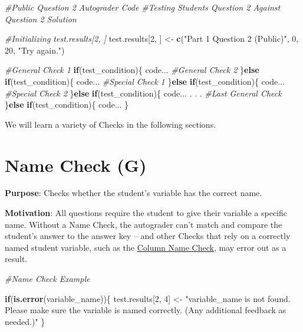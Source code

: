 \documentclass[
  12pt,
]{book}
\newenvironment{Shaded}{\begin{snugshade}}{\end{snugshade}}
\newcommand{\CommentTok}[1]{\textcolor[rgb]{0.56,0.35,0.01}{\textit{#1}}}
\newcommand{\ControlFlowTok}[1]{\textcolor[rgb]{0.13,0.29,0.53}{\textbf{#1}}}
\newcommand{\DecValTok}[1]{\textcolor[rgb]{0.00,0.00,0.81}{#1}}
\newcommand{\FunctionTok}[1]{\textcolor[rgb]{0.13,0.29,0.53}{\textbf{#1}}}
\newcommand{\NormalTok}[1]{#1}
\newcommand{\OtherTok}[1]{\textcolor[rgb]{0.56,0.35,0.01}{#1}}
\newcommand{\StringTok}[1]{\textcolor[rgb]{0.31,0.60,0.02}{#1}}
\begin{document}
\begin{Shaded}
\begin{Highlighting}[]
\CommentTok{\#Public Question 2 Autograder Code}
\CommentTok{\#Testing Student\textquotesingle{}s Question 2 Against Question 2 Solution}

\CommentTok{\#Initializing test.results[2, ]}
\NormalTok{test.results[}\DecValTok{2}\NormalTok{, ] }\OtherTok{\textless{}{-}} \FunctionTok{c}\NormalTok{(}\StringTok{"Part 1 Question 2 (Public)"}\NormalTok{, }\DecValTok{0}\NormalTok{, }\DecValTok{20}\NormalTok{, }\StringTok{"Try again."}\NormalTok{)}

\CommentTok{\#General Check 1}
\ControlFlowTok{if}\NormalTok{(test\_condition)\{ }
\NormalTok{  code... }
\CommentTok{\#General Check 2}
\NormalTok{\}}\ControlFlowTok{else} \ControlFlowTok{if}\NormalTok{(test\_condition)\{ }
\NormalTok{  code...}
\CommentTok{\#Special Check 1}
\NormalTok{\}}\ControlFlowTok{else} \ControlFlowTok{if}\NormalTok{(test\_condition)\{ }
\NormalTok{  code...}
\CommentTok{\#Special Check 2}
\NormalTok{\}}\ControlFlowTok{else} \ControlFlowTok{if}\NormalTok{(test\_condition)\{ }
\NormalTok{  code...}
\NormalTok{.}
\NormalTok{.}
\NormalTok{.}
\CommentTok{\#Last General Check }
\NormalTok{\}}\ControlFlowTok{else} \ControlFlowTok{if}\NormalTok{(test\_condition)\{}
\NormalTok{  code... }
\NormalTok{\}}
\end{Highlighting}
\end{Shaded}

We will learn a variety of Checks in the following sections.

\section{Name Check (G)}\label{Name-Check}

\textbf{Purpose}: Checks whether the student's variable has the correct name.

\textbf{Motivation}: All questions require the student to give their variable a specific name. Without a Name Check, the autograder can't match and compare the student's answer to the answer key -- and other Checks that rely on a correctly named student variable, such as the \hyperref[Column-Name-Check]{Column Name Check}, may error out as a result.

\begin{Shaded}
\begin{Highlighting}[]
\CommentTok{\#Name Check Example}

\ControlFlowTok{if}\NormalTok{(}\FunctionTok{is.error}\NormalTok{(variable\_name))\{ }
\NormalTok{  test.results[}\DecValTok{2}\NormalTok{, }\DecValTok{4}\NormalTok{] }\OtherTok{\textless{}{-}} \StringTok{"\textasciigrave{}variable\_name\textasciigrave{} is not found. Please make sure the variable is named correctly. (Any additional feedback as needed.)"}
\NormalTok{\}}
\end{Highlighting}
\end{Shaded}
\end{document}
